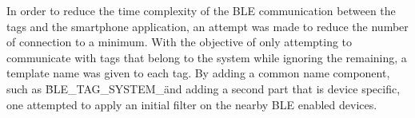  
 
  
In order to reduce the time complexity of the \ac{BLE} communication between the tags and the smartphone application, an attempt was made to reduce the number of connection to a minimum. With the objective of only attempting to communicate with tags that belong to the system while ignoring the remaining, a template name was given to each tag. By adding a common name component, such as \"BLE\_TAG\_SYSTEM\_\" and adding a second part that is device specific, one attempted to apply an initial filter on the nearby \ac{BLE} enabled devices.  
  
  
 
 
  
  
  
 
